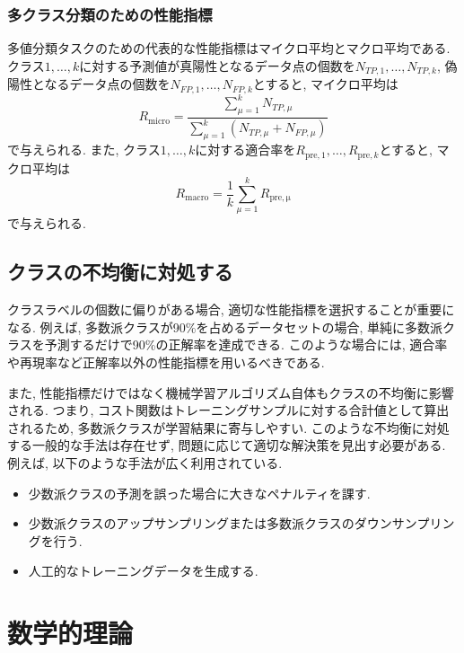 \documentclass[uplatex]{jsarticle}
\theoremstyle{definition}
\numberwithin{equation}{section}
\begin{document}
\subsubsection{多クラス分類のための性能指標}
多値分類タスクのための代表的な性能指標はマイクロ平均とマクロ平均である.
クラス$1, \dots, k$に対する予測値が真陽性となるデータ点の個数を$N_{TP, 1}, \dots, N_{TP, k}$, 偽陽性となるデータ点の個数を$N_{FP, 1}, \dots, N_{FP, k}$とすると, マイクロ平均は
\begin{equation}
    R_{\mathrm{micro}} = \frac{\sum_{\mu = 1}^{k} N_{TP, \mu}}{\sum_{\mu = 1}^{k} (N_{TP, \mu} + N_{FP, \mu})}
\end{equation}
で与えられる.
また, クラス$1, \dots, k$に対する適合率を$R_{\mathrm{pre}, 1}, \dots, R_{\mathrm{pre}, k}$とすると, マクロ平均は
\begin{equation}
    R_{\mathrm{macro}} = \frac{1}{k}\sum_{\mu = 1}^{k} R_{\mathrm{pre, \mu}}
\end{equation}
で与えられる.

\subsection{クラスの不均衡に対処する}
クラスラベルの個数に偏りがある場合, 適切な性能指標を選択することが重要になる.
例えば, 多数派クラスが90\%を占めるデータセットの場合, 単純に多数派クラスを予測するだけで90\%の正解率を達成できる.
このような場合には, 適合率や再現率など正解率以外の性能指標を用いるべきである.

また, 性能指標だけではなく機械学習アルゴリズム自体もクラスの不均衡に影響される.
つまり, コスト関数はトレーニングサンプルに対する合計値として算出されるため, 多数派クラスが学習結果に寄与しやすい.
このような不均衡に対処する一般的な手法は存在せず, 問題に応じて適切な解決策を見出す必要がある.
例えば, 以下のような手法が広く利用されている.
\begin{itemize}
    \item
    少数派クラスの予測を誤った場合に大きなペナルティを課す.

    \item
    少数派クラスのアップサンプリングまたは多数派クラスのダウンサンプリングを行う.

    \item
    人工的なトレーニングデータを生成する.
\end{itemize}


\section{数学的理論}
\end{document}
